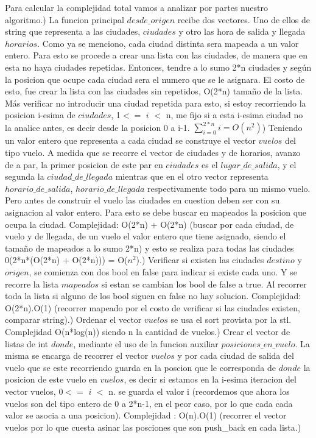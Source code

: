 \documentclass{article}
\begin{document}
Para calcular la complejidad total vamos a analizar por partes nuestro algoritmo.) La funcion principal $desde\_origen$ recibe dos vectores. Uno de ellos de string que representa a las ciudades, $ciudades$ y otro las hora de salida y llegada $horarios$. Como ya se menciono, cada ciudad distinta sera mapeada a un valor entero. Para esto se procede a crear una lista con las ciudades, de manera que en esta no haya ciudades repetidas. Entonces, tendre a lo sumo 2*n ciudades y según la posicion que ocupe cada ciudad sera el numero que se le asignara. El costo de esto, fue crear la lista con las ciudades sin repetidos,  O(2*n) tamaño de la lista. Más verificar no introducir una ciudad repetida para esto, si estoy recorriendo la posicion i-esima de $ciudades$, 1$<=$ $i$ $<$ n,  me fijo si a esta i-esima ciudad no la analice antes, es decir desde la posicion 0 a i-1. \newline
$\sum_{i=0}^{2*n}{i}= O(n^{2})$) Teniendo un valor entero que representa a cada ciudad se construye el vector $vuelos$ del tipo  vuelo. A medida que se recorre el vector de ciudades y de horarios, avanzo de a par, la primer posicion de este par en $ciudades$ es el $lugar\_de\_salida$, y el segunda la $ciudad\_de\_llegada$ mientras que en el otro vector representa $horario\_de\_salida$, $horario\_de\_llegada$ respectivamente todo para un mismo vuelo. Pero antes de construir el vuelo las ciudades en cuestion  deben ser con su asignacion al valor entero. Para esto se debe buscar en mapeados la posicion que ocupa la ciudad. Complejidad:
O(2*n) + O(2*n) (buscar por cada ciudad, de vuelo y de llegada, de un vuelo el valor entero que tiene asignado, siendo el tamaño de mapeados a lo sumo 2*n) y esto se realiza para todas las ciudades 0(2*n*(O(2*n) + O(2*n))) = O($n^{2}$).) Verificar si existen las ciudades $destino$ y $origen$, se comienza con dos bool en false para indicar si existe cada uno.  Y se recorre la lista $mapeados$ si estan se cambian los bool  de false a true.  Al recorrer toda la lista si alguno de los bool siguen en false no hay solucion. Complejidad: O(2*n).O(1) (recorrer mapeado por el costo de verificar si las ciudades existen, comparar string).)    Ordenar el vector $vuelos$ se usa el   sort provista por la stl. Complejidad O(n*log(n)) siendo n la cantidad de vuelos.) Crear el vector de listas de int $donde$, mediante el uso de la funcion auxiliar $posiciones\_en\_vuelo$. La misma se encarga de recorrer el vector $vuelos$ y por cada ciudad de salida del vuelo que se este recorriendo guarda en la poscion que le corresponda de $donde$ la posicion de este vuelo en $vuelos$, es decir si estamos en la i-esima iteracion del vector vuelos, 0$<=$ $i$ $<$ n. se guarda el valor i (recordemos que ahora los vuelos son del tipo entero de 0 a 2*n-1, en el peor caso, por lo que cada cada valor se asocia a una posicion). Complejidad : O(n).O(1) (recorrer el vector vuelos por lo que cuesta asinar las posciones que son push\_back en cada lista.)\newline
\end{document}
